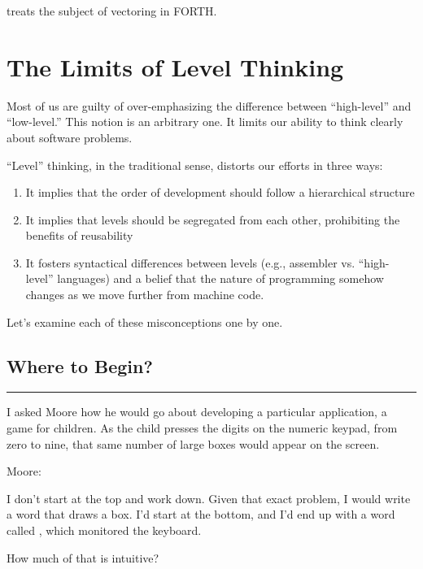  treats the subject of vectoring in FORTH.

\section{The Limits of Level Thinking}

Most of us are guilty of over-emphasizing the difference between
``high-level'' and ``low-level.'' This notion is an arbitrary one. It
limits our ability to think clearly about software problems.

``Level'' thinking, in the traditional sense, distorts our efforts in
three ways:

\begin{enumerate}
	\item It implies that the order of development should follow a hierarchical structure

	\item It implies that levels should be segregated from each other, prohibiting the
benefits of reusability

	\item It fosters syntactical differences between levels (e.g., assembler vs. ``high-level''
languages) and a belief that the nature of programming somehow
changes as we move further from machine code.
\end{enumerate}

Let's examine each of these misconceptions one by one.

\subsection{Where to Begin?}

\hrule height 1pt\vspace{2ex}

I asked Moore how he would go about developing a particular
application, a game for children. As the child presses the digits on
the numeric keypad, from zero to nine, that same number of large boxes
would appear on the screen.

	Moore:

\begin{tfquot}
	I don't start at the top and work down. Given that exact problem, I would
	write a word that draws a box. I'd start at the bottom, and I'd end up with a
	word called , which monitored the keyboard.
\end{tfquot}


\noindent How much of that is intuitive?

